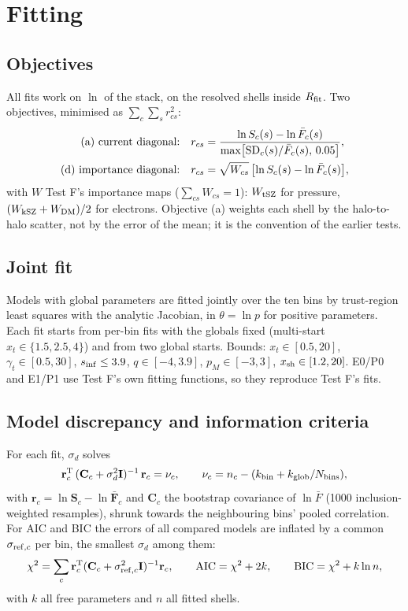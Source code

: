 \documentclass[10pt,a4paper]{article}
\newcommand{\Rfit}{R_{\rm fit}}
\begin{document}
\section{Fitting}\label{sec:fit}

\subsection{Objectives}
All fits work on $\ln$ of the stack, on the resolved shells inside $\Rfit$. Two objectives, minimised as
$\sum_c\sum_s r_{cs}^2$:
\begin{align}
\text{(a) current diagonal:}\quad & r_{cs}=\frac{\ln S_c(s)-\ln\bar F_c(s)}{\max\bigl[{\rm SD}_c(s)/\bar F_c(s),\,0.05\bigr]}, \label{eq:obja}\\
\text{(d) importance diagonal:}\quad & r_{cs}=\sqrt{W_{cs}}\,\bigl[\ln S_c(s)-\ln\bar F_c(s)\bigr],
\end{align}
with $W$ Test F's importance maps ($\sum_{cs}W_{cs}=1$): $W_{\rm tSZ}$ for pressure, $(W_{\rm kSZ}+W_{\rm DM})/2$ for
electrons. Objective (a) weights each shell by the halo-to-halo scatter, not by the error of the mean; it is the convention
of the earlier tests.

\subsection{Joint fit}
Models with global parameters are fitted jointly over the ten bins by trust-region least squares with the analytic
Jacobian, in $\theta=\ln p$ for positive parameters. Each fit starts from per-bin fits with the globals fixed (multi-start
$x_t\in\{1.5,2.5,4\}$) and from two global starts. Bounds: $x_t\in[0.5,20]$, $\gamma_t\in[0.5,30]$, $s_{\rm inf}\le3.9$,
$q\in[-4,3.9]$, $p_M\in[-3,3]$, $x_{\rm sh}\in[1.2,20]$. E0/P0 and E1/P1 use Test F's own fitting functions, so they
reproduce Test F's fits.

\subsection{Model discrepancy and information criteria}
For each fit, $\sigma_d$ solves
\begin{equation}
\mathbf r_c^{\rm T}\,(\mathbf C_c+\sigma_d^2\mathbf I)^{-1}\,\mathbf r_c=\nu_c,\qquad \nu_c=n_c-(k_{\rm bin}+k_{\rm glob}/N_{\rm bins}),
\end{equation}
with $\mathbf r_c=\ln\mathbf S_c-\ln\bar{\mathbf F}_c$ and $\mathbf C_c$ the bootstrap covariance of $\ln\bar F$ (1000
inclusion-weighted resamples), shrunk towards the neighbouring bins' pooled correlation. For AIC and BIC the errors of all
compared models are inflated by a common $\sigma_{{\rm ref},c}$ per bin, the smallest $\sigma_d$ among them:
\begin{equation}
\chi^2=\sum_c \mathbf r_c^{\rm T}(\mathbf C_c+\sigma_{{\rm ref},c}^2\mathbf I)^{-1}\mathbf r_c,\qquad
{\rm AIC}=\chi^2+2k,\qquad {\rm BIC}=\chi^2+k\ln n ,
\end{equation}
with $k$ all free parameters and $n$ all fitted shells.
\end{document}

